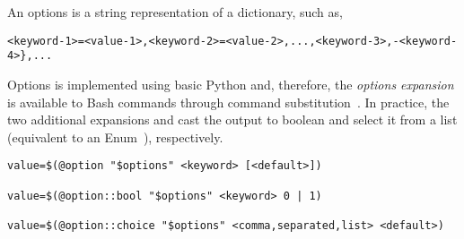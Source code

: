 

An options is a string representation of a dictionary, such as,
%
\begin{verbatim}
<keyword-1>=<value-1>,<keyword-2>=<value-2>,...,<keyword-3>,-<keyword-4>},...
\end{verbatim}
%
Options is implemented using basic Python and, therefore, the \emph{options expansion} is available to Bash commands through command substitution~\cite{command_substitution}. In practice, the two additional expansions  and  cast the output to boolean and select it from a list (equivalent to an Enum~\cite{python_eunum}), respectively.
%
\begin{verbatim}
value=$(@option "$options" <keyword> [<default>])

value=$(@option::bool "$options" <keyword> 0 | 1)

value=$(@option::choice "$options" <comma,separated,list> <default>)
\end{verbatim}
